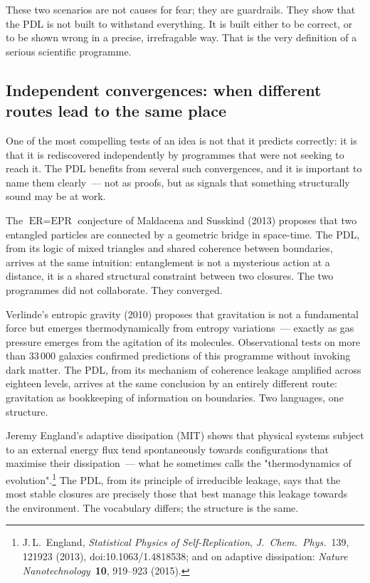 \documentclass[12pt, a4paper, openright]{book}
\begin{document}
\medskip

These two scenarios are not causes for fear; they are guardrails. They show that the PDL is not built to withstand everything. It is built either to be correct, or to be shown wrong in a precise, irrefragable way. That is the very definition of a serious scientific programme.

\subsection*{Independent convergences: when different routes lead to the same place}

One of the most compelling tests of an idea is not that it predicts correctly: it is that it is rediscovered independently by programmes that were not seeking to reach it. The PDL benefits from several such convergences, and it is important to name them clearly~--- not as proofs, but as signals that something structurally sound may be at work.

\medskip

The $\text{ER} = \text{EPR}$ conjecture of Maldacena and Susskind (2013) proposes that two entangled particles are connected by a geometric bridge in space-time. The PDL, from its logic of mixed triangles and shared coherence between boundaries, arrives at the same intuition: entanglement is not a mysterious action at a distance, it is a shared structural constraint between two closures. The two programmes did not collaborate. They converged.

\medskip

Verlinde's entropic gravity (2010) proposes that gravitation is not a fundamental force but emerges thermodynamically from entropy variations~--- exactly as gas pressure emerges from the agitation of its molecules. Observational tests on more than 33\,000 galaxies confirmed predictions of this programme without invoking dark matter. The PDL, from its mechanism of coherence leakage amplified across eighteen levels, arrives at the same conclusion by an entirely different route: gravitation as bookkeeping of information on boundaries. Two languages, one structure.

\medskip

Jeremy England's adaptive dissipation (MIT) shows that physical systems subject to an external energy flux tend spontaneously towards configurations that maximise their dissipation~--- what he sometimes calls the "thermodynamics of evolution".\footnote{J.\,L.~England, \textit{Statistical Physics of Self-Replication}, \textit{J.~Chem.~Phys.}~139, 121923 (2013), doi:10.1063/1.4818538; and on adaptive dissipation: \textit{Nature Nanotechnology}~\textbf{10}, 919--923 (2015).} The PDL, from its principle of irreducible leakage, says that the most stable closures are precisely those that best manage this leakage towards the environment. The vocabulary differs; the structure is the same.
\end{document}
